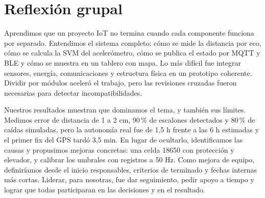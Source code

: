 \documentclass[12pt,a4paper]{article}
\begin{document}
\section{Reflexión grupal}
Aprendimos que un proyecto IoT no termina cuando cada componente funciona por separado. Entendimos el sistema completo: cómo se mide la distancia por eco, cómo se calcula la SVM del acelerómetro, cómo se publica el estado por MQTT y BLE y cómo se muestra en un tablero con mapa. Lo más difícil fue integrar sensores, energía, comunicaciones y estructura física en un prototipo coherente. Dividir por módulos aceleró el trabajo, pero las revisiones cruzadas fueron necesarias para detectar incompatibilidades.

Nuestros resultados muestran que dominamos el tema, y también sus límites. Medimos error de distancia de 1 a 2 cm, 90\,\% de escalones detectados y 80\,\% de caídas simuladas, pero la autonomía real fue de 1,5 h frente a las 6 h estimadas y el primer fix del GPS tardó 3,5 min. En lugar de ocultarlo, identificamos las causas y propusimos mejoras concretas: una celda 18650 con protección y elevador, y calibrar los umbrales con registros a 50 Hz. Como mejora de equipo, definiríamos desde el inicio responsables, criterios de terminado y fechas internas más cortas. Liderar, para nosotras, fue dar seguimiento, pedir apoyo a tiempo y lograr que todas participaran en las decisiones y en el resultado.
\end{document}

